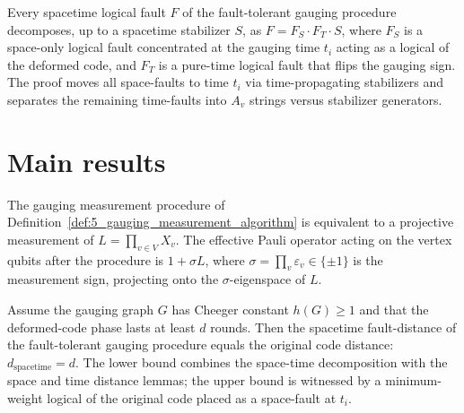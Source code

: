 \begin{lemma}
\label{lem:7_space_time_decoupling}
\leanok
Every spacetime logical fault $F$ of the fault-tolerant gauging procedure decomposes, up to a
spacetime stabilizer $S$, as $F = F_S \cdot F_T \cdot S$, where $F_S$ is a space-only
logical fault concentrated at the gauging time $t_i$ acting as a logical of the deformed
code, and $F_T$ is a pure-time logical fault that flips the gauging sign. The proof moves
all space-faults to time $t_i$ via time-propagating stabilizers and separates the
remaining time-faults into $A_v$ strings versus stabilizer generators.
\end{lemma}

\chapter{Main results}

\begin{theorem}
\label{thm:1_gauging_correctness}
\leanok
The gauging measurement procedure of
Definition~\ref{def:5_gauging_measurement_algorithm} is equivalent to a projective
measurement of $L = \prod_{v \in V} X_v$. The effective Pauli operator acting on the vertex
qubits after the procedure is $1 + \sigma L$, where $\sigma = \prod_v \varepsilon_v \in \{\pm 1\}$
is the measurement sign, projecting onto the $\sigma$-eigenspace of $L$.
\end{theorem}

\begin{theorem}
\label{thm:2_ft_gauging_distance}
\leanok
Assume the gauging graph $G$ has Cheeger constant $h(G) \ge 1$ and that the deformed-code
phase lasts at least $d$ rounds. Then the spacetime fault-distance of the fault-tolerant
gauging procedure equals the original code distance: $d_{\mathrm{spacetime}} = d$. The lower
bound combines the space-time decomposition with the space and time distance lemmas; the
upper bound is witnessed by a minimum-weight logical of the original code placed as a
space-fault at $t_i$.
\end{theorem}

